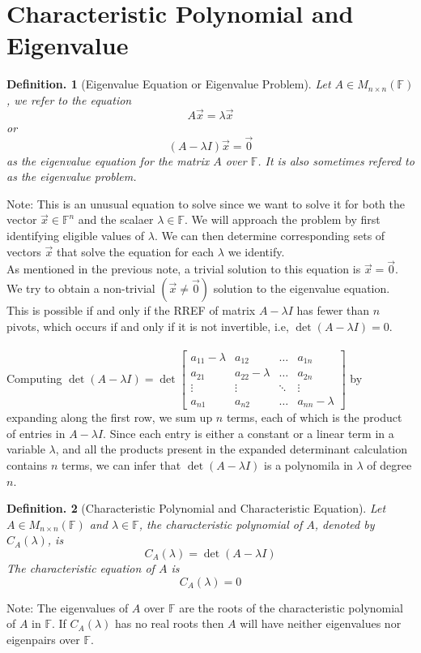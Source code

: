 \documentclass[11pt, a4paper]{memoir}
\theoremstyle{change}
\theoremstyle{plain}
\theoremstyle{nonumberplain}
\newtheorem{definition}{Definition.}
\numberwithin{equation}{section}
\begin{document}
\section{Characteristic Polynomial and Eigenvalue}
\begin{definition}[Eigenvalue Equation or Eigenvalue Problem]
    Let $A\in M_{n \times n}(\mathbb{F})$, we refer to the equation $$A\vec{x} = \lambda \vec{x}$$
    or  $$(A - \lambda I)\vec{x} = \vec{0}$$ as the eigenvalue equation for the matrix $A$ over $\mathbb{F}$. It is also sometimes refered to as the eigenvalue problem. 
\end{definition}
Note: This is an unusual equation to solve since we want to solve it for both the vector $\vec{x} \in \mathbb{F}^n$ and the scalaer $\lambda \in \mathbb{F}$. We will approach the problem by first identifying eligible values of $\lambda $. We can then determine corresponding sets of vectors $\vec{x}$ that solve the equation for each $\lambda $ we identify. 
\\
As mentioned in the previous note, a trivial solution to this equation is $\vec{x} = \vec{0}$. We try to obtain a non-trivial $(\vec{x} \ne \vec{0})$ solution to the eigenvalue equation. This is possible if and only if the RREF of matrix $A - \lambda I$ has fewer than $n $ pivots, which occurs if and only if it is not invertible, i.e, $\det(A - \lambda I) = 0$.
\\ \; \\
Computing $\det(A - \lambda I) = \det \begin{bmatrix} a_{11} - \lambda & a_{12} & \dots & a_{1n}\\
    a_{21} & a_{22} - \lambda & \dots & a_{2n}\\
    \vdots & \vdots & \ddots & \vdots \\
    a_{n1} & a_{n2} & \dots & a_{nn} - \lambda \end{bmatrix}$ by expanding along the first row, we sum up $n $ terms, each of which is the product of entries in $A - \lambda I$. Since each entry is either a constant or a linear term in a variable $\lambda $, and all the products present in the expanded determinant calculation contains $n$ terms, we can infer that $\det(A - \lambda I)$ is a polynomila in $\lambda $ of degree $n$.

\begin{definition}[Characteristic Polynomial and Characteristic Equation]
    Let $A\in M_{n \times n}(\mathbb{F})$ and $\lambda \in \mathbb{F}$, the characteristic polynomial of $A$, denoted by $C_A(\lambda)$, is 
    $$C_A(\lambda) = \det(A - \lambda I)$$
    The characteristic equation of $A$ is $$C_A(\lambda) = 0$$
\end{definition}
Note: The eigenvalues of $A$ over $\mathbb{F}$ are the roots of the characteristic polynomial of $A$ in $\mathbb{F}$.
If $C_A(\lambda)$ has no real roots then $A $ will have neither eigenvalues nor eigenpairs over $\mathbb{F}$.
\end{document}
